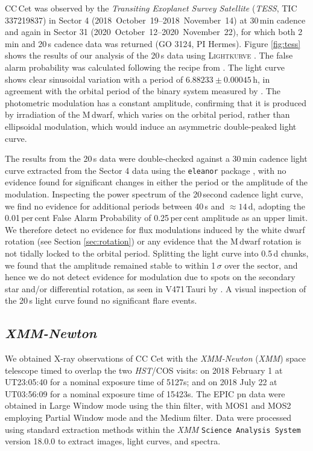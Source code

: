 \documentclass[fleqn,usenatbib]{mnras}
\begin{document}
CC\,Cet was observed by the \textit{Transiting Exoplanet Survey Satellite} (\textit{TESS}, TIC 337219837) in Sector 4 (2018~October~19--2018~November~14) at 30\,min cadence and again in Sector 31 (2020~October~12--2020~November~22), for which both  2\,min and 20\,s cadence data was returned (GO 3124, PI Hermes). Figure \ref{fig:tess} shows the results of our analysis of the 20\,s data using \textsc{Lightkurve} . The false alarm probability was calculated following the recipe from \citet{belletal19-1}. The light curve shows clear sinusoidal variation with a period of $6.88233\pm0.00045$\,h, in agreement with the orbital period of the binary system measured by \citet{somersetal96-2}. The photometric modulation has a constant amplitude, confirming that it is produced by irradiation of the M\,dwarf, which varies on the orbital period, rather than ellipsoidal modulation, which would induce an asymmetric double-peaked light curve.  

The results from the 20\,s data were double-checked against a 30\,min cadence light curve extracted from the Sector 4 data using the \texttt{eleanor} package \citep{feinsteinetal19-1}, with no evidence found for significant changes in either the
period or the amplitude of the modulation. Inspecting the power spectrum of the 20\,second cadence light curve, we find no evidence for additional periods between 40\,s and $\approx14$\,d, adopting the 0.01\,per\,cent False Alarm Probability of 0.25\,per\,cent amplitude as an upper limit. We therefore detect no evidence for flux modulations induced by the white dwarf rotation (see Section \ref{sec:rotation}) or any evidence that the M\,dwarf rotation is not tidally locked to the orbital period. Splitting the light curve into  0.5\,d chunks, we found that the amplitude remained stable to within 1\,$\sigma$ over the sector, and hence we do not detect evidence for modulation due to spots on the secondary star and/or differential rotation, as seen in V471\,Tauri by \citet{kovarietal21-1}. A visual inspection of the 20\,s light curve found no significant flare events.  



\subsection{\textit{XMM-Newton}}

We obtained X-ray observations of CC Cet with the {\em XMM-Newton} (\textit{XMM}) space telescope timed to overlap the two \textit{HST}/COS visits: on 2018 February 1 at UT23:05:40 for a nominal exposure time of 5127s; and on 2018 July 22 at UT03:56:09 for a nominal exposure time of 15423s. The EPIC pn data were obtained in Large Window mode using the thin filter, with MOS1 and MOS2 employing Partial Window mode and the Medium filter. Data were processed using standard extraction methods within the \textit{XMM} {\tt Science Analysis System} version 18.0.0 to extract images, light curves, and spectra.  
\end{document}
